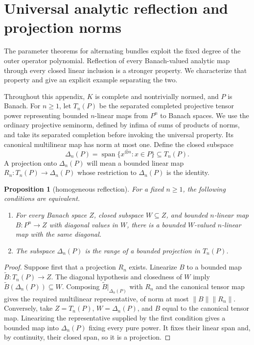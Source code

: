 \documentclass[11pt]{amsart}
\newtheorem{proposition}[theorem]{Proposition}
\theoremstyle{definition}
\theoremstyle{remark}
\numberwithin{equation}{section}
\newcommand{\spn}{\operatorname{span}}
\newcommand{\norm}[1]{\lVert #1\rVert}
\begin{document}
\section{Universal analytic reflection and projection norms}\label{app:reflection}\label{fam:sec:tensors}
The parameter theorems for alternating bundles exploit the fixed degree of the outer operator
polynomial. Reflection of every Banach-valued analytic map through every closed linear inclusion is a
stronger property. We characterize that property and give an explicit example separating the two.

Throughout this appendix, $K$ is complete and nontrivially normed, and $P$ is Banach.
For $n\ge1$, let $T_n(P)$ be the separated completed projective tensor power representing bounded
$n$\nobreakdash-linear maps from $P^n$ to Banach spaces. We use the ordinary projective seminorm,
defined by infima of sums of products of norms, and take its separated completion before invoking
the universal property. Its canonical multilinear map has norm at most one.
Define the closed subspace
\[
 \Delta_n(P)=\overline{\spn\{x^{\otimes n}:x\in P\}}\subseteq T_n(P).
\]
A projection onto $\Delta_n(P)$ will mean a bounded linear map
$R_n\colon T_n(P)\to\Delta_n(P)$ whose restriction to $\Delta_n(P)$ is the identity.

\begin{proposition}[homogeneous reflection]\label{fam:prop:tensor-homogeneous}
For a fixed $n\ge1$, the following conditions are equivalent.
\begin{enumerate}
\item For every Banach space $Z$, closed subspace $W\subseteq Z$, and bounded $n$\nobreakdash-linear map
$B\colon P^n\to Z$ with diagonal values in $W$, there is a bounded $W$\nobreakdash-valued
$n$\nobreakdash-linear map with the same diagonal.
\item The subspace $\Delta_n(P)$ is the range of a bounded projection in $T_n(P)$.
\end{enumerate}
\end{proposition}

\begin{proof}
Suppose first that a projection $R_n$ exists. Linearize $B$ to a bounded map
$\widetilde B\colon T_n(P)\to Z$. The diagonal hypothesis and closedness of $W$ imply
$\widetilde B(\Delta_n(P))\subseteq W$.
Composing $\widetilde B|_{\Delta_n(P)}$ with $R_n$ and the canonical tensor map gives the required
multilinear representative, of norm at most $\norm B\norm{R_n}$.
Conversely, take $Z=T_n(P)$, $W=\Delta_n(P)$, and $B$ equal to the canonical tensor map.
Linearizing the representative supplied by the first condition gives a bounded map into $\Delta_n(P)$
fixing every pure power. It fixes their linear span and, by continuity, their closed span, so it is a projection.
\end{proof}
\end{document}
